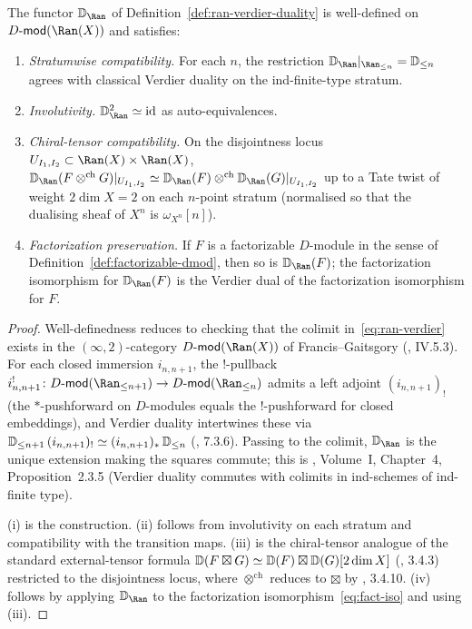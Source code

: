 \begin{proposition}
\label{prop:ran-verdier-well-defined}
The functor $\bD_{\Ran}$ of Definition~\ref{def:ran-verdier-duality} is
well-defined on $\Dmod(\Ran(X))$ and satisfies:
\begin{enumerate}[label=\textup{(\roman*)}]
\item \emph{Stratumwise compatibility.} For each $n$, the restriction
 $\bD_{\Ran}|_{\Ran_{\leq n}} = \bD_{\leq n}$ agrees with classical
 Verdier duality on the ind-finite-type stratum.
\item \emph{Involutivity.} $\bD_{\Ran}^{2} \simeq \id$ as auto-equivalences.
\item \emph{Chiral-tensor compatibility.} On the disjointness locus
 $U_{I_1,I_2} \subset \Ran(X) \times \Ran(X)$,
 $\bD_{\Ran}(F \otimes^{\mathrm{ch}} G)|_{U_{I_1,I_2}} \simeq
 \bD_{\Ran}(F) \otimes^{\mathrm{ch}} \bD_{\Ran}(G)|_{U_{I_1,I_2}}$
 up to a Tate twist of weight $2 \dim X = 2$ on each $n$-point stratum
 (normalised so that the dualising sheaf of $X^n$ is $\omega_{X^n}[n]$).
\item \emph{Factorization preservation.} If $F$ is a factorizable
 $D$-module in the sense of Definition~\ref{def:factorizable-dmod},
 then so is $\bD_{\Ran}(F)$; the factorization isomorphism for
 $\bD_{\Ran}(F)$ is the Verdier dual of the factorization isomorphism
 for $F$.
\end{enumerate}
\end{proposition}

\begin{proof}
Well-definedness reduces to checking that the colimit
in~\eqref{eq:ran-verdier} exists in the $(\infty,2)$-category
$\Dmod(\Ran(X))$ of Francis--Gaitsgory (\cite{GR17}, IV.5.3). For each
closed immersion $i_{n,n+1}$, the $!$-pullback
$i_{n,n+1}^{!}\colon \Dmod(\Ran_{\leq n+1}) \to \Dmod(\Ran_{\leq n})$
admits a left adjoint $(i_{n,n+1})_{!}$ (the $*$-pushforward on
$D$-modules equals the $!$-pushforward for closed embeddings), and
Verdier duality intertwines these via
$\mathbb{D}_{\leq n+1}\,(i_{n,n+1})_{!} \simeq (i_{n,n+1})_{\ast}\,\mathbb{D}_{\leq n}$
(\cite{BD04}, 7.3.6). Passing to the colimit, $\bD_{\Ran}$ is the
unique extension making the squares commute; this is
\cite{GR17}, Volume~I, Chapter~4, Proposition~2.3.5 (Verdier duality
commutes with colimits in ind-schemes of ind-finite type).

(i) is the construction. (ii) follows from involutivity on each
stratum and compatibility with the transition maps. (iii) is the
chiral-tensor analogue of the standard external-tensor formula
$\mathbb{D}(F \boxtimes G) \simeq \mathbb{D}(F) \boxtimes \mathbb{D}(G)[2\dim X]$
(\cite{KS90}, 3.4.3) restricted to the disjointness locus, where
$\otimes^{\mathrm{ch}}$ reduces to $\boxtimes$ by
\cite{BD04}, 3.4.10. (iv) follows by applying $\bD_{\Ran}$ to the
factorization isomorphism~\eqref{eq:fact-iso} and using (iii).
\end{proof}

